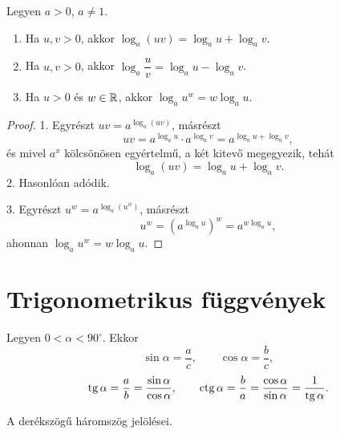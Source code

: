 \documentclass[11pt]{article}
\begin{document}
\begin{thmbox}
\begin{theorem}
Legyen $a>0$, $a\neq 1$.
\begin{enumerate}[label=\arabic*.]
\item Ha $u, v>0$, akkor $\log_{a}(uv)=\log_{a}u+\log_{a}v$.
\item Ha $u, v>0$, akkor $\log_{a}\dfrac{u}{v}=\log_{a}u-\log_{a}v$.
\item Ha $u>0$ és $w\in\mathbb{R}$, akkor $\log_{a}u^{w}=w\log_{a}u$.
\end{enumerate}
\end{theorem}
\end{thmbox}
\begin{proof}
1. Egyrészt $uv=a^{\log_{a}(uv)}$, másrészt
\[
uv=a^{\log_{a}u}\cdot a^{\log_{a}v}=a^{\log_{a}u+\log_{a}v},
\]
és mivel $a^{x}$ kölcsönösen egyértelmű, a két kitevő megegyezik, tehát
\[
\log_{a}(uv)=\log_{a}u+\log_{a}v .
\]
2. Hasonlóan adódik.

3. Egyrészt $u^{w}=a^{\log_{a}(u^{w})}$, másrészt
\[
u^{w}=\left(a^{\log_{a}u}\right)^{w}=a^{w\log_{a}u},
\]
ahonnan $\log_{a}u^{w}=w\log_{a}u$.
\end{proof}

\section{Trigonometrikus függvények}

\begin{defbox}
\begin{definition}
Legyen $0<\alpha<90^{\circ}$. Ekkor
\[
\sin\alpha=\frac{a}{c},\qquad \cos\alpha=\frac{b}{c},
\]
\[
\operatorname{tg}\alpha=\frac{a}{b}=\frac{\sin\alpha}{\cos\alpha},\qquad
\operatorname{ctg}\alpha=\frac{b}{a}=\frac{\cos\alpha}{\sin\alpha}=\frac{1}{\operatorname{tg}\alpha}.
\]
\end{definition}
\end{defbox}

\begin{notefig}{A derékszögű háromszög jelölései.}
\end{notefig}
\end{document}
